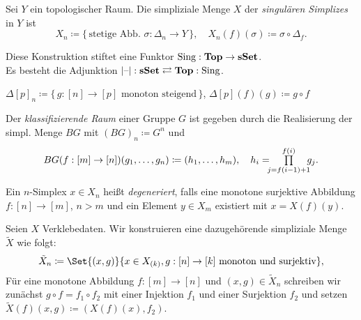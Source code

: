 \documentclass{cheat-sheet}
\newcommand{\nspace}[1]{\foreach \i in {1,...,#1}{ \! }} %
\DeclareMathOperator{\Sing}{Sing} %
\begin{document}
\begin{defn}
  Sei $Y$ ein topologischer Raum. Die simpliziale Menge $X$ der \emph{singulären Simplizes} in $Y$ ist
  \[
    X_n \coloneqq \{ \, \text{stetige Abb. } \sigma : \Delta_n \to Y \, \}, \quad
    X_n(f)(\sigma) \coloneqq \sigma \circ \Delta_f.
  \]
\end{defn}

\begin{bem}
  Diese Konstruktion stiftet eine Funktor $\Sing : \Top \to \sSet$. \\
  Es besteht die Adjunktion \enspace $\abs{\blank} : \sSet \rightleftarrows \Top : \Sing$.
\end{bem}

\begin{defn}
  $\Delta[p]_n \coloneqq \{ \, g : [n] \to [p] \text{ monoton steigend} \, \}$, $\Delta[p](f)(g) \coloneqq g \circ f$
\end{defn}

\begin{defn}
  Der \emph{klassifizierende Raum} einer Gruppe $G$ ist gegeben durch die Realisierung der simpl. Menge $BG$ mit $(BG)_n \coloneqq G^n$ und
  \begin{align*}
    BG(f : [m] \to [n])(g_1, \ldots, g_n) \coloneqq
    (h_1, \ldots, h_m), \quad h_i = \nspace{3} \prod_{j=f(i-1)+1}^{f(i)} \nspace{3} g_j.
  \end{align*}
\end{defn}

\begin{defn}
  Ein $n$-Simplex $x \in X_n$ heißt \emph{degeneriert}, falls eine monotone surjektive Abbildung $f : [n] \to [m]$, $n > m$ und ein Element $y \in X_m$ existiert mit $x = X(f)(y)$.
\end{defn}

\begin{defn}
  Seien $X$ Verklebedaten. Wir konstruieren eine dazugehörende simpliziale Menge $\tilde{X}$ wie folgt:
  \[ \tilde{X}_n \coloneqq \Set{ (x, g) }{ x \in X_{(k)}, g : [n] \to [k] \text{ monoton und surjektiv} }, \]
  Für eine monotone Abbildung $f : [m] \to [n]$ und $(x, g) \in \tilde{X}_n$ schreiben wir zunächst $g \circ f = f_1 \circ f_2$ mit einer Injektion $f_1$ und einer Surjektion $f_2$ und setzen
  $\tilde{X}(f)(x, g) \coloneqq (X(f)(x), f_2)$.
\end{defn}
\end{document}
